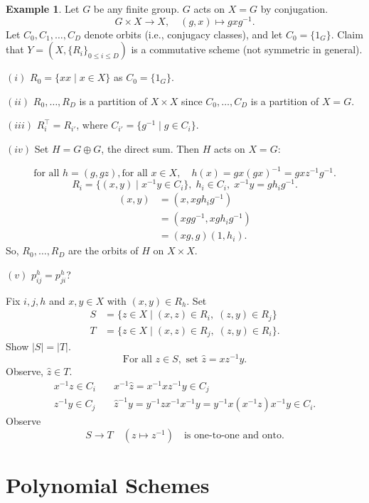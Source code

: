 \documentclass[
]{book}
\theoremstyle{definition}
\theoremstyle{definition}
\newtheorem{example}{Example}[chapter]
\theoremstyle{definition}
\theoremstyle{definition}
\theoremstyle{remark}
\begin{document}
\begin{example}
\protect\hypertarget{exm:centralizer-alg}{}\label{exm:centralizer-alg}Let \(G\) be any finite group. \(G\) acts on \(X = G\) by conjugation.
\[G\times X \to X, \quad (g,x)\mapsto gxg^{-1}.\]
Let \(C_0, C_1, \ldots, C_D\) denote orbits (i.e., conjugacy classes), and let \(C_0 = \{1_G\}\).
Claim that \(Y = (X, \{R_i\}_{0\leq i\leq D})\) is a commutative scheme (not symmetric in general).

\((i)\) \(R_0 = \{xx\mid x\in X\}\) as \(C_0 = \{1_G\}\).

\((ii)\) \(R_0, \ldots, R_D\) is a partition of \(X\times X\) since \(C_0, \ldots, C_D\) is a partition of \(X = G\).

\((iii)\) \(R_i^\top = R_{i'}\), where \(C_{i'} = \{g^{-1}\mid g\in C_i\}\).

\((iv)\) Set \(H = G\oplus G\), the direct sum. Then \(H\) acts on \(X = G\):

\[\text{for all }h = (g,gz), \text{for all }x\in X, \quad h(x) = gx(gx)^{-1} = gxz^{-1}g^{-1}.\]
\[R_i = \{(x,y)\mid x^{-1}y\in C_i\}, \; h_i\in C_i, \; x^{-1}y = gh_ig^{-1}.\]
\begin{align}
(x,y) & = (x, xgh_ig^{-1})\\
& = (xgg^{-1}, xgh_ig^{-1})\\
& = (xg, g)(1,h_i).
\end{align}
So, \(R_0, \ldots, R_D\) are the orbits of \(H\) on \(X\times X\).

\((v)\) \(p^h_{ij} = p^h_{ji}\)?

Fix \(i,j, h\) and \(x, y\in X\) with \((x,y)\in R_h\). Set
\begin{align}
S & = \{z\in X\mid (x,z)\in R_i, \; (z,y)\in R_j\}\\
T & = \{z\in X\mid (x,z)\in R_j, \; (z,y)\in R_i\}.
\end{align}
Show \(|S| = |T|\).
\[\text{For all }z\in S, \text{ set } \hat{z} = xz^{-1}y.\]
Observe, \(\hat{z}\in T\).
\begin{align}
x^{-1}z\in C_i \quad  & x^{-1}\hat{z} = x^{-1}xz^{-1}y\in C_j\\
z^{-1}y\in C_j \quad  & \hat{z}^{-1}y = y^{-1}zx^{-1}x^{-1}y = y^{-1}x(x^{-1}z)x^{-1}y \in C_i.
\end{align}
Observe
\[S\to T \quad (z\mapsto z^{-1}) \quad \text{is one-to-one and onto.}\]
\end{example}

\hypertarget{lec18}{%
\chapter{Polynomial Schemes}\label{lec18}}
\end{document}
